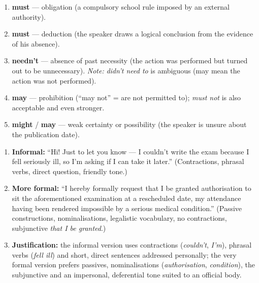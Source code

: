 \documentclass[11pt]{article}
\newcounter{popsec}
\newcounter{popsub}
\newcommand{\courssub}[1]{%
  \stepcounter{popsub}%
  \par\vspace{9pt}\noindent{\popxbold\fontsize{11.5}{13}\selectfont\color{popink}{\color{poporange}\thepopsec.\thepopsub}\hspace{6pt}#1}\par\nopagebreak\vspace{4pt}
}
\begin{document}
\begin{corrige}
\begin{enumerate}
\item \textbf{must} — obligation (a compulsory school rule imposed by an external authority).
\item \textbf{must} — deduction (the speaker draws a logical conclusion from the evidence of his absence).
\item \textbf{needn't} — absence of past necessity (the action was performed but turned out to be unnecessary). \emph{Note:} \emph{didn't need to} is ambiguous (may mean the action was not performed).
\item \textbf{may} — prohibition (``may not'' = are not permitted to); \emph{must not} is also acceptable and even stronger.
\item \textbf{might} / \textbf{may} — weak certainty or possibility (the speaker is unsure about the publication date).
\end{enumerate}
\end{corrige}

\courssub{I practise}

\begin{corrige}
\begin{enumerate}
\item \textbf{Informal:} ``Hi! Just to let you know --- I couldn't write the exam because I fell seriously ill, so I'm asking if I can take it later.'' (Contractions, phrasal verbs, direct question, friendly tone.)
\item \textbf{More formal:} ``I hereby formally request that I be granted authorisation to sit the aforementioned examination at a rescheduled date, my attendance having been rendered impossible by a serious medical condition.'' (Passive constructions, nominalisations, legalistic vocabulary, no contractions, subjunctive \emph{that I be granted}.)
\item \textbf{Justification:} the informal version uses contractions (\emph{couldn't}, \emph{I'm}), phrasal verbs (\emph{fell ill}) and short, direct sentences addressed personally; the very formal version prefers passives, nominalisations (\emph{authorisation}, \emph{condition}), the subjunctive and an impersonal, deferential tone suited to an official body.
\end{enumerate}
\end{corrige}
\end{document}
